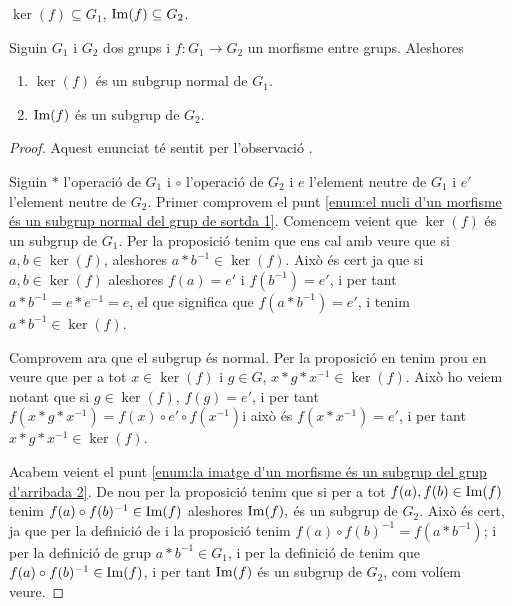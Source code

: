 \documentclass[../../Main.tex]{subfiles}
\begin{document}
	\begin{observation}
		\label{obs:nucli d'un morfisme entre grups es subconjunt del grup d'entrada, imatge n'és del de sortida}
		\(\ker(f)\subseteq G_{1}\), \(\operatorname{Im}(f)\subseteq G_{2}\).
	\end{observation}
	\begin{proposition}
		\label{prop:el nucli d'un morfisme és un subgrup normal del grup de sortda}
		\label{prop:la imatge d'un morfisme és un subgrup del grup d'arribada}
		Siguin \(G_{1}\) i \(G_{2}\) dos grups i \(f\colon G_{1}\to G_{2}\) un morfisme entre grups. Aleshores
		\begin{enumerate}
			\item\label{enum:el nucli d'un morfisme és un subgrup normal del grup de sortda 1} \(\ker(f)\) és un subgrup normal de \(G_{1}\).
			\item\label{enum:la imatge d'un morfisme és un subgrup del grup d'arribada 2} \(\operatorname{Im}(f)\) és un subgrup de \(G_{2}\).
		\end{enumerate}
		\begin{proof}
			Aquest enunciat té sentit per l'observació .
			
			Siguin \(\ast\) l'operació de \(G_{1}\) i \(\circ\) l'operació de \(G_{2}\) i \(e\) l'element neutre de \(G_{1}\) i \(e'\) l'element neutre de \(G_{2}\). Primer comprovem el punt \eqref{enum:el nucli d'un morfisme és un subgrup normal del grup de sortda 1}. Comencem veient que \(\ker(f)\) és un subgrup de \(G_{1}\). Per la proposició  tenim que ens cal amb veure que si \(a,b\in\ker(f)\), aleshores \(a\ast b^{-1}\in\ker(f)\). Això és cert ja que si \(a,b\in\ker(f)\) aleshores \(f(a)=e'\) i \(f(b^{-1})=e'\), i per tant \(a\ast b^{-1}=e\ast e^{-1}=e\), el que significa que \(f(a\ast b^{-1})=e'\), i tenim \(a\ast b^{-1}\in\ker(f)\).
			
			Comprovem ara que el subgrup és normal. Per la proposició  en tenim prou en veure que per a tot \(x\in\ker(f)\) i \(g\in G\), \(x\ast g\ast x^{-1}\in\ker(f)\). Això ho veiem notant que si \(g\in\ker(f)\), \(f(g)=e'\), i per tant \(f(x\ast g\ast x^{-1})=f(x)\circ e'\circ f(x^{-1})\)i això és \(f(x\ast x^{-1})=e'\), i per tant \(x\ast g\ast x^{-1}\in\ker(f)\).
			
			Acabem veient el punt \eqref{enum:la imatge d'un morfisme és un subgrup del grup d'arribada 2}. De nou per la proposició  tenim que si per a tot \(f(a),f(b)\in\operatorname{Im}(f)\) tenim \(f(a)\circ f(b)^{-1}\in\operatorname{Im}(f)\) aleshores \(\operatorname{Im}(f),\) és un subgrup de \(G_{2}\). Això és cert, ja que per la definició de  i la proposició  tenim \(f(a)\circ f(b)^{-1}=f(a\ast b^{-1})\); i per la definició de grup \(a\ast b^{-1}\in G_{1}\), i per la definició de  tenim que \(f(a)\circ f(b)^{-1}\in\operatorname{Im}(f)\), i per tant \(\operatorname{Im}(f)\) és un subgrup de \(G_{2}\), com volíem veure.
		\end{proof}
	\end{proposition}
\end{document}
